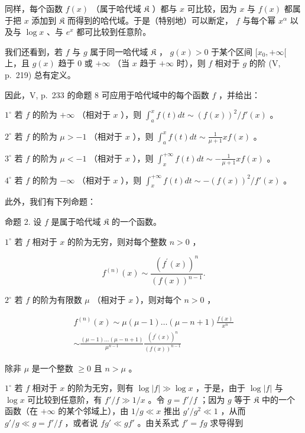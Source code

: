 同样，每个函数 \(f(x)\) （属于哈代域 \(\mathfrak{K}\) ）都与 \(x\) 可比较，因为 \(x\) 与 \(f(x)\) 都属于把 \(x\) 添加到 \(\mathfrak{K}\) 而得到的哈代域。于是（特别地）可以断定， \(f\) 与每个幂 \(x^{\alpha}\) 以及与 \(\log x\) 、与 \(e^{x}\) 都可比较到任意阶。

我们还看到，若 \(f\) 与 \(g\) 属于同一哈代域 \(\mathfrak{K}\) ， \(g(x) > 0\) 于某个区间 \([x_0, +\infty[\) 上，且 \(g(x)\) 趋于 0 或 \(+\infty\) （当 \(x\) 趋于 \(+\infty\) 时），则 \(f\) 相对于 \(g\) 的阶 (V, p.~219) 总有定义。

因此，V, p.~233 的命题 8 可应用于哈代域中的每个函数 \(f\) ，并给出：

\(1^{\circ}\) 若 \(f\) 的阶为 \(+\infty\) （相对于 \(x\) ），则 \(\int_{a}^{x} f(t) dt \sim (f(x))^{2} / f'(x)\) 。

\(2^{\circ}\) 若 \(f\) 的阶为 \(\mu > -1\) （相对于 \(x\) ），则 \(\int_{a}^{x} f(t) dt \sim \frac{1}{\mu + 1} xf(x)\) 。

\(3^{\circ}\) 若 \(f\) 的阶为 \(\mu < -1\) （相对于 \(x\) ），则 \(\int_{x}^{+\infty} f(t) dt \sim -\frac{1}{\mu + 1} xf(x)\) 。

\(4^{\circ}\) 若 \(f\) 的阶为 \(-\infty\) （相对于 \(x\) ），则 \(\int_{x}^{+\infty} f(t) dt \sim -(f(x))^{2} / f'(x)\) 。

此外，我们有下列命题：

命题 2. 设 \(f\) 是属于哈代域 \(\mathfrak{K}\) 的一个函数。

\(1^{\circ}\) 若 \(f\) 相对于 \(x\) 的阶为无穷，则对每个整数 \(n > 0\) ，

\[
f ^ {(n)} (x) \sim \frac {(f ^ {\prime} (x)) ^ {n}}{(f (x)) ^ {n - 1}}.\tag{2}
\]

\(2^{\circ}\) 若 \(f\) 的阶为有限数 \(\mu\) （相对于 \(x\) ），则对每个 \(n > 0\) ，

\[
\begin{array}{c} f ^ {(n)} (x) \sim \mu (\mu - 1) \ldots (\mu - n + 1) \frac {f (x)}{x ^ {n}} \\ \sim \frac {(\mu - 1) \ldots (\mu - n + 1)}{\mu^ {n - 1}} \frac {(f ^ {\prime} (x)) ^ {n}}{(f (x)) ^ {n - 1}} \end{array}\tag{3}
\]

除非 \(\mu\) 是一个整数 \(\geqslant 0\) 且 \(n > \mu\) 。

\(1^{\circ}\) 若 \(f\) 相对于 \(x\) 的阶为无穷，则有 \(\log |f| \gg \log x\) ，于是，由于 \(\log |f|\) 与 \(\log x\) 可比较到任意阶，有 \(f'/f \gg 1/x\) 。令 \(g = f'/f\) ；因为 \(g\) 等于 \(\mathfrak{K}\) 中的一个函数（在 \(+\infty\) 的某个邻域上），由 \(1/g \ll x\) 推出 \(g'/g^{2} \ll 1\) ，从而 \(g'/g \ll g = f'/f\) ，或者说 \(fg' \ll gf'\) 。由关系式 \(f' = fg\) 求导得到

